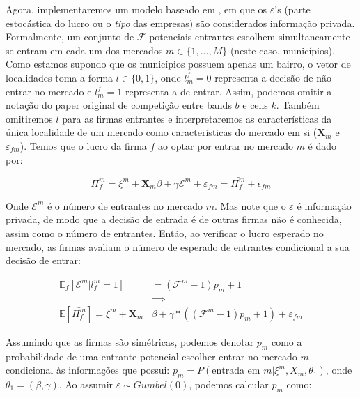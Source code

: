 \documentclass{article}
\begin{document}
Agora, implementaremos um modelo baseado em , em que os $\varepsilon$'s (parte estocástica do lucro ou o \emph{tipo} das empresas) são considerados informação privada. Formalmente, um conjunto de $\mathcal{F}$ potenciais entrantes escolhem simultaneamente se entram em cada um dos mercados $m \in \{1, ..., M\}$ (neste caso, municípios). Como estamos supondo que os municípios possuem apenas um bairro, o vetor de localidades toma a forma $l \in \{0,1\}$, onde $l^f_m = 0$ representa a decisão de não entrar no mercado e $l^f_m = 1$ representa a de entrar. Assim, podemos omitir a notação do paper original de competição entre bands $b$ e cells $k$. Também omitiremos $l$ para as firmas entrantes e interpretaremos as características da única localidade de um mercado como características do mercado em si ($\mathbf{X}_m$ e $\varepsilon_{fm}$). Temos que o lucro da firma $f$ ao optar por entrar no mercado $m$ é dado por:

\begin{equation*}
        \Pi_{f}^m=\xi^m+\mathbf{X}_{m}\beta+\gamma \mathcal{E}^m +\varepsilon_{fm} = \bar{\Pi_f^m} + \epsilon_{fm}
\end{equation*}

Onde $\mathcal{E}^m$ é o número de entrantes no mercado $m$. Mas note que o $\varepsilon$ é informação privada, de modo que a decisão de entrada é de outras firmas não é conhecida, assim como o número de entrantes. Então, ao verificar o lucro esperado no mercado, as firmas avaliam o número de esperado de entrantes condicional a sua decisão de entrar:

\begin{equation*}
\begin{aligned}
        \mathbb{E}_f[\mathcal{E}^m | l_{f}^m = 1] &= (\mathcal{F}^m - 1)p_m + 1\\
        &\implies\\
        \mathbb{E}[\bar{\Pi^m_f}]= \xi^m+\mathbf{X}_{m}&\beta+\gamma*( (\mathcal{F}^m - 1)p_m + 1) +\varepsilon_{fm}
\end{aligned}
\end{equation*} 

Assumindo que as firmas são simétricas, podemos denotar $p_m$ como a probabilidade de uma entrante potencial escolher entrar no mercado $m$ condicional às informações que possui: $p_m = P(\text{entrada em } m | \xi^m, X_m, \theta_1)$, onde $\theta_1 = (\beta, \gamma) $. Ao assumir $\varepsilon \sim Gumbel(0)$, podemos calcular $p_m$ como:
\end{document}
